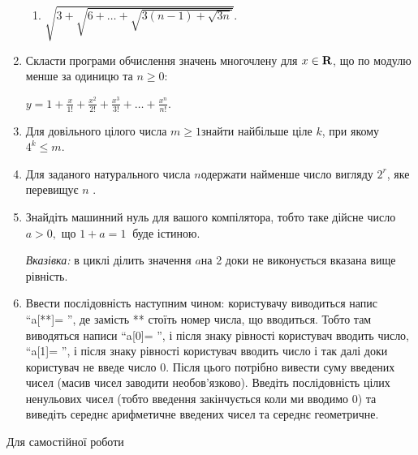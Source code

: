 \documentclass[]{article}
\makeatletter
\newcommand{\xslalph}[1]{\expandafter\@xslalph\csname c@#1\endcsname}
\newcommand{\@xslalph}[1]{%
    \ifcase#1\or а\or б\or в\or г\or д\or e\or є\or ж\or з\or i%
    \or й\or к\or л\or м\or н\or о\or п\or р\or с\or т%
    \or у\or ф\or х\or ц\or ч\or ш\or ю\or я\or аа\or бб\or вв %
    \else\@ctrerr\fi%
}
\makeatother
\begin{document}
\begin{enumerate}
\begin{enumerate}[label=\xslalph*)]
\item
 \(\sqrt{3 + \sqrt{6 + \ldots + \sqrt{3(n - 1) + \sqrt{3n}}}}.\)

\end{enumerate}

\item
  Скласти програми обчислення значень многочлену для 
  \(x \in \bf{R}\), що по модулю менше за одиницю та
  \( n \geq 0\):

\(y = 1 + \frac{x}{1!} + \frac{x^{2}}{2!} + \frac{x^{3}}{3!} + \ldots + \frac{x^{n}}{n!} \).

\item
  Для довільного цілого числа \(m \geq 1\)знайти найбільше ціле \(k\),
  при якому \(4^{k} \leq m\).
\item
  Для заданого натурального числа \(n\)одержати найменше число вигляду
  \(2^{r}\), яке перевищує \(n\) .
\item
  Знайдіть машинний нуль для вашого компілятора, тобто таке дійсне число
  \(a > 0,\) що \(1 + a = 1\ \) буде істиною.

\emph{Вказівка:} в циклі ділить значення \(a\)на 2 доки не виконується
вказана вище рівність.

\item
  Ввести послідовність наступним чином: користувачу виводиться напис
  ``a{[}**{]}= '', де замість ** стоїть номер числа, що вводиться. Тобто
  там виводяться написи ``a{[}0{]}= '', і після знаку рівності
  користувач вводить число, ``a{[}1{]}= '', і після знаку рівності
  користувач вводить число і так далі доки користувач не введе число 0.
  Після цього потрібно вивести суму введених чисел (масив чисел заводити
  необов'язково). Введіть послідовність цілих ненульових чисел (тобто введення
  закінчується коли ми вводимо 0) та виведіть середнє арифметичне
  введених чисел та середнє геометричне.

\end{enumerate}

Для самостійної роботи
\end{document}

